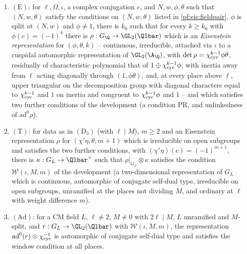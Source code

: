 \begin{definition}\label{pf:eis:denseinputs}
\leavevmode
\begin{enumerate}[label=(\alph*)]
\item $(\mathrm{E})$: for $\ell,\Omega,\iota$, a complex conjugation $c$, and $N,w,\phi,\theta$ such that $(N,w,\theta)$ satisfy the conditions
  on $(N,w,\theta)$ listed in \cref{pf:eis:fieldpair}, $\phi$ is split at $(N,w)$ and $\phi\ne1$, there is $k_0$ such that for every $k\ge k_0$
  with $\phi(c)=(-1)^k$ there is $\rho:G_\Q\to\GL_2(\Qlbar)$ which is an \emph{Eisenstein representation} for $(\phi,\theta,k)$ --
  continuous, irreducible, attached via $\iota$ to a cuspidal automorphic representation of $\GL_2(\A_\Q)$, with
  $\det\rho=\chi_{\mathrm{cyc}}^{k-1}\phi\theta$, residually of characteristic polynomial that of $1\oplus\chi_{\mathrm{cyc}}^{k-1}\phi$, with inertia away from $\ell$
  acting diagonally through $(1,\phi\theta)$, and, at every place above $\ell$, upper triangular on the decomposition group with diagonal
  characters equal to $\chi_{\mathrm{cyc}}^{k-1}$ and $1$ on inertia and congruent to $\chi_{\mathrm{cyc}}^{k-1}\phi$ and $1$ -- and which satisfies two further
  conditions of the development (a condition $\mathrm{PR}$, and unlinkedness of $\mathrm{ad}^0\rho$).
\item $(\mathrm{T})$: for data as in $(\mathrm{D}_3)$ (with $\ell\mid M$), $m\ge2$ and an Eisenstein representation $\rho$ for $(\chi'\eta,\theta,m+1)$
  which is irreducible on open subgroups and satisfies the two further conditions, with $(\chi'\eta)(c)=(-1)^{m+1}$, there is
  $\kappa:G_L\to\Qlbar^\times$ such that $\rho|_{G_L}\otimes\kappa$ satisfies the condition $\mathcal W(\iota,M,m)$ of the development (a
  two-dimensional representation of $G_L$ which is continuous, automorphic of conjugate self-dual type, irreducible on open subgroups,
  unramified at the places not dividing $M$, and ordinary at $\ell$ with weight difference $m$).
\item $(\mathrm{Ad})$: for a CM field $L$, $\ell\ne2$, $M\ne0$ with $2\ell\mid M$, $L$ unramified and $M$-split, and $r:G_L\to\GL_2(\Qlbar)$ with
  $\mathcal W(\iota,M,m)$, the representation $\mathrm{ad}^0(r)\otimes\chi_{\mathrm{cyc}}^{-1}$ is automorphic of conjugate self-dual type and satisfies the
  window condition at all places.
\end{enumerate}
\end{definition}

